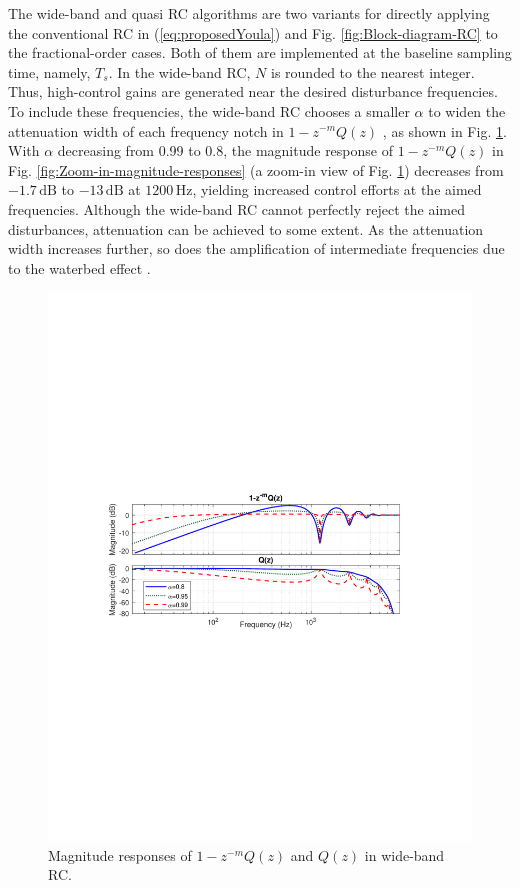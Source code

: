 \documentclass [11pt, proquest] {uwthesis}[2020/02/24]
\begin{document}
The wide-band and quasi RC algorithms are two variants for directly
applying the conventional RC in (\ref{eq:proposedYoula}) and Fig. \ref{fig:Block-diagram-RC}
to the fractional-order cases. Both of them are implemented at the
baseline sampling time, namely, $T_{s}$. In the wide-band RC, $N$
is rounded to the nearest integer. Thus, high-control gains are generated
near the desired disturbance frequencies. To include these frequencies,
the wide-band RC chooses a smaller $\alpha$ to widen the attenuation
width of each frequency notch in $1-z^{-m}Q(z)$ , as shown in Fig.
\ref{fig:Q_wideband}. With $\alpha$ decreasing from 0.99 to 0.8,
the magnitude response of $1-z^{-m}Q(z)$ in Fig. \ref{fig:Zoom-in-magnitude-responses}
(a zoom-in view of Fig. \ref{fig:Q_wideband}) decreases from $-1.7\,\text{dB}$
to $-13\,\text{dB}$ at $1200\,\text{Hz}$, yielding increased control
efforts at the aimed frequencies. Although the wide-band RC cannot
perfectly reject the aimed disturbances, attenuation can be achieved
to some extent. As the attenuation width increases further, so does
the amplification of intermediate frequencies due to the waterbed
effect \cite{Bode1945}.
\begin{figure}[!ht]
\begin{centering}
\includegraphics[width=14cm]{Fractional-order-RC/Q_wideband}
\par\end{centering}
\caption{\label{fig:Q_wideband}Magnitude responses of $1-z^{-m}Q\left(z\right)$
and $Q\left(z\right)$ in wide-band RC.}
\end{figure}
\end{document}
